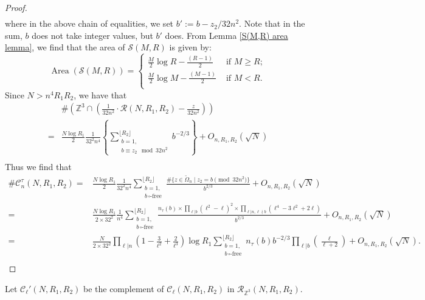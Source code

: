 \documentclass[table]{amsart}
\newcommand{\Z}{\mathbb{Z}}
\newcommand{\cC}{\mathcal{C}}
\newcommand{\op}[1]{\operatorname{#1}}
\numberwithin{equation}{section}
\begin{document}
\begin{proof}
\[\begin{split}
    \end{split}\] 
    where in the above chain of equalities, we set $b':=b-z_2/32n^2$. Note that in the sum, $b$ does not take integer values, but $b'$ does. From Lemma \ref{S(M,R) area lemma}, we find that the area of $\mathcal{S}(M, R)$ is given by: \[
\op{Area}\left(\mathcal{S}(M, R)\right)=\begin{cases}
 \frac{M}{2}\log R -\frac{(R-1)}{2} &\text{ if }M\geq R;\\
 \frac{M}{2}\log M-\frac{(M-1)}{2} & \text{ if }M<R.\\
\end{cases}\]
Since $N>n^4R_1R_2$, we have that 
\[\begin{split}
    &\# \left(\Z^3 \cap \left(\frac{1}{32n^2}\cdot \mathcal{R}(N, R_1, R_2)-\frac{z}{32n^2}\right)\right) \\
    =& \frac{N\log R_1}{2}\frac{1}{32^2n^4}\left\{\sum_{\substack{b=1,\\
    b\equiv z_2\mod{32 n^2}}}^{\lfloor R_2\rfloor}  b^{-2/3}\right\}+O_{n, R_1, R_2}(\sqrt{N}) \\
\end{split}\]
Thus we find that 
\[\begin{split}
    \#\mathcal{C}_n^\tau(N, R_1, R_2)=& \frac{N\log R_1}{2}\frac{1}{32^2n^4}\sum_{\substack{b=1,\\
    b\,\square\text{-free}}}^{\lfloor R_2\rfloor}  \frac{\#\{z\in \widetilde{\Omega}_n\mid z_2=b\pmod{32n^2}\}}{b^{2/3}}+O_{n, R_1, R_2}(\sqrt{N})\\
    =& \frac{N\log R_1 }{2 \times 32^2}\frac{1}{n^4}\sum_{\substack{b=1,\\
    b\,\square\text{-free}}}^{\lfloor R_2\rfloor}  \frac{n_\tau(b)\times\prod_{\ell|b}(\ell^2-\ell)^2\times \prod_{\ell|n, \ell\nmid b} \left(\ell^4-3\ell^2+2\ell\right)}{b^{2/3}}+O_{n, R_1, R_2}(\sqrt{N})\\
     =& \frac{N }{2\times 32^2}\prod_{\ell|n} \left(1-\frac{3}{\ell^2}+\frac{2}{\ell^3}\right)\log R_1\sum_{\substack{b=1,\\
    b\,\square\text{-free}}}^{\lfloor R_2\rfloor}  n_\tau(b)b^{-2/3}\prod_{\ell|b}\left(\frac{\ell}{\ell+2}\right)+O_{n, R_1, R_2}(\sqrt{N}).\\
\end{split}\]
\end{proof}
\noindent Let $\cC_\ell'(N, R_1, R_2)$ be the complement of $\cC_\ell(N, R_1, R_2)$ in $\mathcal{R}_{\Z^3}(N, R_1, R_2)$.
\end{document}
